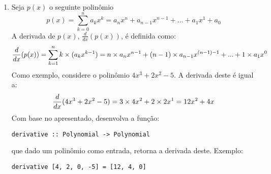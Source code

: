 \documentclass[10pt,a4paper]{report}
\begin{document}
\begin{enumerate}
\begin{enumerate}
\begin{verbatim}
    	\end{verbatim}
    	que recebe como par\^ametro dois polin\^omios possivelmente n\~ao normalizados e retorna um par contendo
    	os dois polin\^omios fornecidos como par\^ametros normalizados. Exemplo:
    	\begin{verbatim}
normalize [4, 2, 0, -5] [6, 0, 1] = ([4,2,0,-5], [0,6,0,1])
    	\end{verbatim}
    	\item Utilizando a fun\c{c}\~ao \texttt{normalize}, desenvolvida no item anterior, implemente a fun\c{c}\~ao
	    \begin{verbatim}
		(.+.) :: Polynomial -> Polynomial -> Polynomial
    	\end{verbatim}   
    	que soma dois polin\^omios fornecidos como argumento. Exemplo:
    	\begin{verbatim}
[4,2,0,-5] .+. [0,6,0,1] = [4, 8, 0, -4]    	   
    	\end{verbatim}
    \end{enumerate}
    \item Seja $p(x)$ o seguinte polin\^omio
\begin{equation*}
   p(x) = \sum_{k=0}^{n}a_{k}x^{k} = a_{n}x^{n} + a_{n - 1}x^{n - 1} + ... + a_{1}x^{1} + a_{0}
\end{equation*}    
    A derivada de $p(x)$, $\frac{\displaystyle{d}}{\displaystyle{dx}}(p(x))$, \'e definida como:
\begin{equation*}
   \frac{\displaystyle{d}}{\displaystyle{dx}}(p(x)) = \sum_{k=1}^{n}k\times (a_{k}x^{k - 1}) =\\
   n\times a_{n}x^{n - 1} + (n - 1)\times a_{n - 1}x^{(n - 1) - 1} + ... + 1\times a_{1}x^{0}
\end{equation*}    
   Como exemplo, considere o polin\^omio $4x^{3} + 2x^{2} - 5$. A derivada deste \'e igual a:
   \begin{equation*}
       \frac{\displaystyle{d}}{\displaystyle{dx}}(4x^{3} + 2x^{2} - 5) = \\
       3\times 4x^{2} + 2 \times 2x^{1} = \\
       12 x^{2} + 4x
   \end{equation*}
   Com base no apresentado, desenvolva a fun\c{c}\~ao:
   \begin{verbatim}
derivative :: Polynomial -> Polynomial
   \end{verbatim}
   que dado um polin\^omio como entrada, retorna a derivada deste. Exemplo:
   \begin{verbatim}
derivative [4, 2, 0, -5] = [12, 4, 0]

\end{verbatim}
\end{enumerate}
\end{document}
